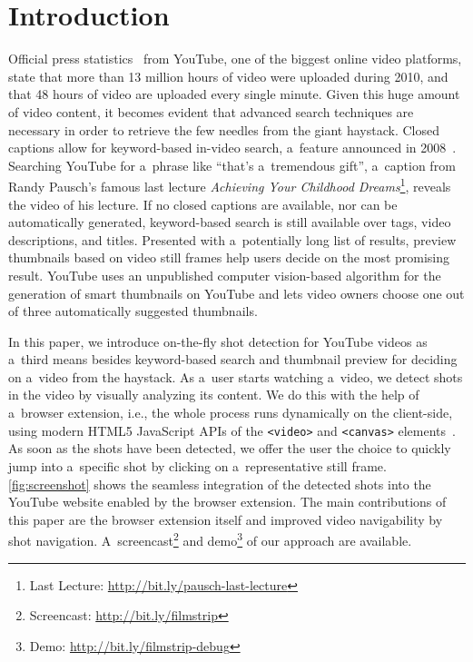 \documentclass{sig-alternate}
\newcommand{\inlinelistingsize}{\fontsize{8pt}{11pt}}
\let\oldurl\url
\renewcommand{\url}[1]{\inlinelistingsize\oldurl{#1}}
\begin{document}



\section{Introduction}
Official press statistics~\cite{youtube:stats} from YouTube, one of the biggest online video platforms, state that more than 13 million hours of video were uploaded during 2010, and that 48 hours of video are uploaded every single minute. Given this huge amount of video content, it becomes evident that advanced search techniques are necessary in order to retrieve the few needles from the giant haystack. Closed captions allow for keyword-based in-video search, a~feature announced in 2008~\cite{googlevideo}. Searching YouTube for a~phrase like ``that's a~tremendous gift'', a~caption from Randy Pausch's famous last lecture \emph{Achieving Your Childhood Dreams}\footnote{Last Lecture: \url{http://bit.ly/pausch-last-lecture}}, reveals the video of his lecture. If no closed captions are available, nor can be automatically generated, keyword-based search is still available over tags, video descriptions, and titles. Presented with a~potentially long list of results, preview thumbnails based on video still frames help users decide on the most promising result. YouTube uses an unpublished computer vision-based algorithm for the generation of smart thumbnails on YouTube and lets video owners choose one out of three automatically suggested thumbnails.

In this paper, we introduce on-the-fly shot detection for YouTube videos as a~third means besides keyword-based search and thumbnail preview for deciding on a~video from the haystack. As a~user starts watching a~video, we detect shots in the video by visually analyzing its content. We do this with the help of a~browser extension, i.e., the whole process runs dynamically on the client-side, using modern HTML5 JavaScript APIs of the \texttt{<video>} and \texttt{<canvas>} elements~\cite{w3c_html5}. As soon as the shots have been detected, we offer the user the choice to quickly jump into a~specific shot by clicking on a~representative still frame. \autoref{fig:screenshot} shows the seamless integration of the detected shots into the YouTube website enabled by the browser extension. The main contributions of this paper are the browser extension itself and improved video navigability by shot navigation. A~screencast\footnote{Screencast: \url{http://bit.ly/filmstrip}} and demo\footnote{Demo: \url{http://bit.ly/filmstrip-debug}} of our approach are available.
\end{document}
